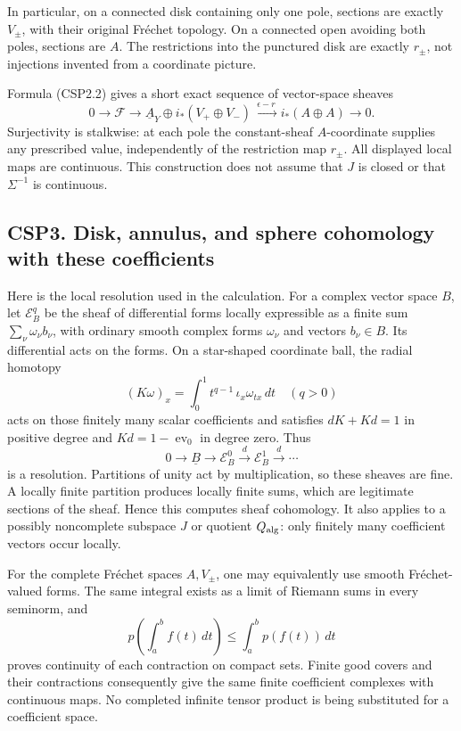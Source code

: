In particular, on a connected disk containing only one pole, sections
are exactly \(V_\pm\), with their original Fréchet topology. On a
connected open avoiding both poles, sections are \(A\). The restrictions
into the punctured disk are exactly \(r_\pm\), not injections invented
from a coordinate picture.

Formula (CSP2.2) gives a short exact sequence of vector-space sheaves \[
0\longrightarrow\mathscr F
\longrightarrow\underline A_Y\oplus i_*(V_+\oplus V_-)
\xrightarrow{\ \epsilon-r\ }i_*(A\oplus A)
\longrightarrow0.
\tag{CSP2.3}
\] Surjectivity is stalkwise: at each pole the constant-sheaf
\(A\)-coordinate supplies any prescribed value, independently of the
restriction map \(r_\pm\). All displayed local maps are continuous. This
construction does not assume that \(J\) is closed or that
\(\Sigma^{-1}\) is continuous.

\subsection{CSP3. Disk, annulus, and sphere cohomology with these
coefficients}\label{csp3.-disk-annulus-and-sphere-cohomology-with-these-coefficients}

Here is the local resolution used in the calculation. For a complex
vector space \(B\), let \(\mathscr E_B^q\) be the sheaf of differential
forms locally expressible as a finite sum \(\sum_\nu\omega_\nu b_\nu\),
with ordinary smooth complex forms \(\omega_\nu\) and vectors
\(b_\nu\in B\). Its differential acts on the forms. On a star-shaped
coordinate ball, the radial homotopy \[
(K\omega)_x=\int_0^1 t^{q-1}
\,\iota_x\omega_{tx}\,dt\quad(q>0)
\tag{CSP3.1}
\] acts on those finitely many scalar coefficients and satisfies
\(dK+Kd=1\) in positive degree and \(Kd=1-\operatorname{ev}_0\) in
degree zero. Thus \[
0\to\underline B\to\mathscr E_B^0\xrightarrow d
\mathscr E_B^1\xrightarrow d\cdots
\tag{CSP3.2}
\] is a resolution. Partitions of unity act by multiplication, so these
sheaves are fine. A locally finite partition produces locally finite
sums, which are legitimate sections of the sheaf. Hence this computes
sheaf cohomology. It also applies to a possibly noncomplete subspace
\(J\) or quotient \(Q_{\rm alg}\): only finitely many coefficient
vectors occur locally.

For the complete Fréchet spaces \(A,V_\pm\), one may equivalently use
smooth Fréchet-valued forms. The same integral exists as a limit of
Riemann sums in every seminorm, and \[
p\!\left(\int_a^b f(t)\,dt\right)
\le\int_a^b p(f(t))\,dt
\tag{CSP3.3}
\] proves continuity of each contraction on compact sets. Finite good
covers and their contractions consequently give the same finite
coefficient complexes with continuous maps. No completed infinite tensor
product is being substituted for a coefficient space.

